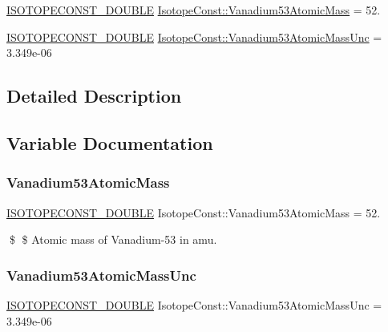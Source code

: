 \begin{DoxyCompactItemize}
\item 
\mbox{\hyperlink{group___isotope_const-_macros_ga8f45a7272ce02c0b4c65c44636ed719a}{I\+S\+O\+T\+O\+P\+E\+C\+O\+N\+S\+T\+\_\+\+D\+O\+U\+B\+LE}} \mbox{\hyperlink{group___isotope_const-_vanadium-_v53_ga249dd95f9ad07a1f6447a35ac170e8c6}{Isotope\+Const\+::\+Vanadium53\+Atomic\+Mass}} = 52.
\item 
\mbox{\hyperlink{group___isotope_const-_macros_ga8f45a7272ce02c0b4c65c44636ed719a}{I\+S\+O\+T\+O\+P\+E\+C\+O\+N\+S\+T\+\_\+\+D\+O\+U\+B\+LE}} \mbox{\hyperlink{group___isotope_const-_vanadium-_v53_ga697f8d5527822d852346697287c30e66}{Isotope\+Const\+::\+Vanadium53\+Atomic\+Mass\+Unc}} = 3.\+349e-\/06
\end{DoxyCompactItemize}


\subsection{Detailed Description}


\subsection{Variable Documentation}
\mbox{\label{group___isotope_const-_vanadium-_v53_ga249dd95f9ad07a1f6447a35ac170e8c6}} 
\subsubsection{\texorpdfstring{Vanadium53\+Atomic\+Mass}{Vanadium53AtomicMass}}
{\footnotesize\ttfamily \mbox{\hyperlink{group___isotope_const-_macros_ga8f45a7272ce02c0b4c65c44636ed719a}{I\+S\+O\+T\+O\+P\+E\+C\+O\+N\+S\+T\+\_\+\+D\+O\+U\+B\+LE}} Isotope\+Const\+::\+Vanadium53\+Atomic\+Mass = 52.}

\$ \$ Atomic mass of Vanadium-\/53 in amu. \mbox{\label{group___isotope_const-_vanadium-_v53_ga697f8d5527822d852346697287c30e66}} 
\subsubsection{\texorpdfstring{Vanadium53\+Atomic\+Mass\+Unc}{Vanadium53AtomicMassUnc}}
{\footnotesize\ttfamily \mbox{\hyperlink{group___isotope_const-_macros_ga8f45a7272ce02c0b4c65c44636ed719a}{I\+S\+O\+T\+O\+P\+E\+C\+O\+N\+S\+T\+\_\+\+D\+O\+U\+B\+LE}} Isotope\+Const\+::\+Vanadium53\+Atomic\+Mass\+Unc = 3.\+349e-\/06}

